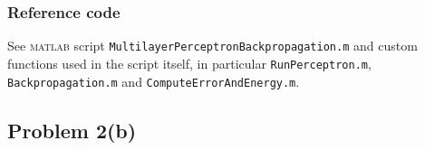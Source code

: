 \documentclass[12pt,titlepage]{article}
\begin{document}
\vspace*{-0.4cm}
\subsubsection*{Reference code}
\vspace*{-0.3cm}
See \textsc{matlab} script \verb!MultilayerPerceptronBackpropagation.m! and custom functions used in the script itself, in particular \verb!RunPerceptron.m!, \verb!Backpropagation.m! and \verb!ComputeErrorAndEnergy.m!.
\enlargethispage{\baselineskip}


\clearpage
\restoregeometry


\subsection*{Problem 2(b)}
\end{document}
